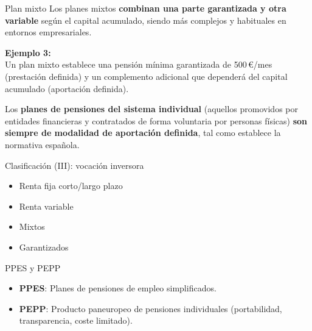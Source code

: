 \documentclass[
  ignorenonframetext,
  aspectratio=54,
  spanish,
]{beamer}
\providecommand{\tightlist}{%
  \setlength{\itemsep}{0pt}\setlength{\parskip}{0pt}}
\begin{document}
\begin{frame}{Plan mixto}
\label{plan-mixto}
Los planes mixtos \textbf{combinan una parte garantizada y otra
variable} según el capital acumulado, siendo más complejos y habituales
en entornos empresariales.

\textbf{Ejemplo 3:}\\
Un plan mixto establece una pensión mínima garantizada de 500\,€/mes
(prestación definida) y un complemento adicional que dependerá del
capital acumulado (aportación definida).

\begin{tcolorbox}[enhanced jigsaw, rightrule=.15mm, colback=white, arc=.35mm, colframe=quarto-callout-note-color-frame, bottomrule=.15mm, left=2mm, toptitle=1mm, colbacktitle=quarto-callout-note-color!10!white, leftrule=.75mm, bottomtitle=1mm, titlerule=0mm, title=\textcolor{quarto-callout-note-color}{\faInfo}\hspace{0.5em}{\textbf{Importante:}\\
}, opacityback=0, coltitle=black, toprule=.15mm, opacitybacktitle=0.6, breakable]

Los \textbf{planes de pensiones del sistema individual} (aquellos
promovidos por entidades financieras y contratados de forma voluntaria
por personas físicas) \textbf{son siempre de modalidad de aportación
definida}, tal como establece la normativa española.\\

\end{tcolorbox}
\end{frame}

\begin{frame}{Clasificación (III): vocación inversora}
\label{clasificaciuxf3n-iii-vocaciuxf3n-inversora}
\begin{itemize}
\tightlist
\item
  Renta fija corto/largo plazo
\item
  Renta variable
\item
  Mixtos
\item
  Garantizados
\end{itemize}
\end{frame}

\begin{frame}{PPES y PEPP}
\label{ppes-y-pepp}
\begin{itemize}
\tightlist
\item
  \textbf{PPES}: Planes de pensiones de empleo simplificados.
\item
  \textbf{PEPP}: Producto paneuropeo de pensiones individuales
  (portabilidad, transparencia, coste limitado).
\end{itemize}
\end{frame}
\end{document}
